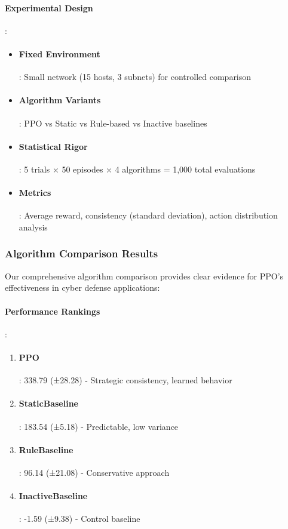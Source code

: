 \documentclass[12pt,oneside]{article}
\begin{document}
\paragraph{Experimental Design}:
\begin{itemize}
\item \paragraph{Fixed Environment}: Small network (15 hosts, 3 subnets) for controlled comparison
\item \paragraph{Algorithm Variants}: PPO vs Static vs Rule-based vs Inactive baselines
\item \paragraph{Statistical Rigor}: 5 trials × 50 episodes × 4 algorithms = 1,000 total evaluations
\item \paragraph{Metrics}: Average reward, consistency (standard deviation), action distribution analysis
\end{itemize}

\subsubsection{Algorithm Comparison Results}

Our comprehensive algorithm comparison provides clear evidence for PPO's effectiveness in cyber defense applications:

\paragraph{Performance Rankings}:
\begin{enumerate}
\item \paragraph{PPO}: 338.79 (±28.28) - Strategic consistency, learned behavior  
\item \paragraph{StaticBaseline}: 183.54 (±5.18) - Predictable, low variance
\item \paragraph{RuleBaseline}: 96.14 (±21.08) - Conservative approach
\item \paragraph{InactiveBaseline}: -1.59 (±9.38) - Control baseline
\end{enumerate}
\end{document}
